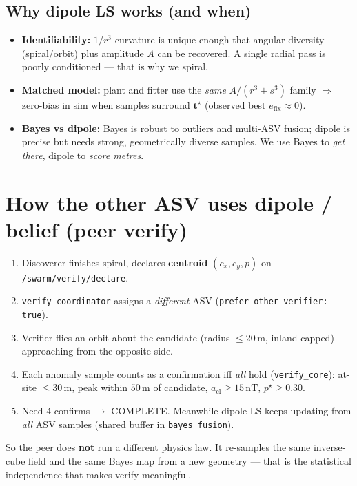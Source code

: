 \documentclass[11pt,a4paper]{article}
\begin{document}
\subsection{Why dipole LS works (and when)}
\begin{itemize}[leftmargin=*]
  \item \textbf{Identifiability:} \(1/r^{3}\) curvature is unique enough that
        angular diversity (spiral/orbit) plus amplitude \(A\) can be recovered.
        A single radial pass is poorly conditioned --- that is why we spiral.
  \item \textbf{Matched model:} plant and fitter use the \emph{same}
        \(A/(r^{3}+s^{3})\) family \(\Rightarrow\) zero-bias in sim when
        samples surround \(\mathbf{t}^{\star}\) (observed best \(e_{\mathrm{fix}}\approx0\)).
  \item \textbf{Bayes vs dipole:} Bayes is robust to outliers and multi-ASV
        fusion; dipole is precise but needs strong, geometrically diverse
        samples. We use Bayes to \emph{get there}, dipole to \emph{score metres}.
\end{itemize}

\section{How the other ASV uses dipole / belief (peer verify)}

\begin{enumerate}[leftmargin=*]
  \item Discoverer finishes spiral, declares \textbf{centroid}
        \((c_x,c_y,p)\) on \texttt{/swarm/verify/declare}.
  \item \texttt{verify\_coordinator} assigns a \emph{different} ASV
        (\texttt{prefer\_other\_verifier: true}).
  \item Verifier flies an orbit about the candidate (radius \(\le20\,\mathrm{m}\),
        inland-capped) approaching from the opposite side.
  \item Each anomaly sample counts as a confirmation iff
        \emph{all} hold (\texttt{verify\_core}):
        at-site \(\le30\,\mathrm{m}\), peak within \(50\,\mathrm{m}\) of
        candidate, \(a_{\mathrm{cl}}\ge15\,\mathrm{nT}\), \(p^{\star}\ge0.30\).
  \item Need 4 confirms \(\to\) COMPLETE. Meanwhile dipole LS keeps updating
        from \emph{all} ASV samples (shared buffer in \texttt{bayes\_fusion}).
\end{enumerate}
So the peer does \textbf{not} run a different physics law. It re-samples the
same inverse-cube field and the same Bayes map from a new geometry --- that is
the statistical independence that makes verify meaningful.
\end{document}

